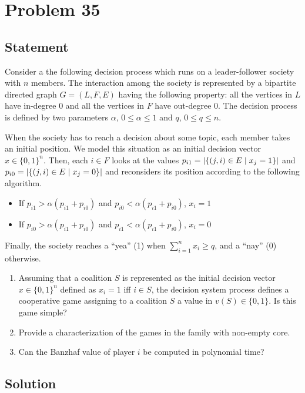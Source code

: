 \documentclass[a4paper, 11pt]{article}
\newcommand{\onemm}[0]{\hspace{1mm}}
\newcommand{\suchthat}[0]{\onemm|\onemm}
\begin{document}
\section*{Problem 35}
{\color{statement}
\subsection*{Statement}
Consider a the following decision process which runs on a leader-follower society with $n$ members. The interaction among the society is represented by a bipartite directed graph $G = (L,F,E)$ having the following property: all the vertices in $L$ have in-degree 0 and all the vertices in $F$ have out-degree 0. The decision process is defined by two parameters $\alpha$, $0 \leq \alpha \leq 1$ and $q$, $0 \leq q \leq n$.

When the society has to reach a decision about some topic, each member takes an initial position. We model this situation as an initial decision vector $x \in \{0, 1\}^n$. Then, each $i \in F$ looks at the values $p_{i1} =|\{(j,i) \in E \suchthat x_j = 1\}|$ and $p_{i0} = |\{(j,i) \in E \suchthat x_j = 0\}|$ and reconsiders its position according to the following algorithm.

\begin{itemize}
    \item If $p_{i1} > \alpha(p_{i1}+p_{i0})$ and $p_{i0} < \alpha(p_{i1}+p_{i0})$, $x_i =1$
    \item If $p_{i0} > \alpha(p_{i1}+p_{i0})$ and $p_{i1} < \alpha(p_{i1}+p_{i0})$, $x_i =0$
\end{itemize}

Finally, the society reaches a ``yea'' (1) when $\sum^n_{i=1} x_i \geq q$, and a ``nay'' (0) otherwise.
\begin{enumerate}[label=(\alph*)]
    \item Assuming that a coalition $S$ is represented as the initial decision vector $x \in \{0,1\}^n$ defined as $x_i = 1$ iff $i \in S$, the decision system process defines a cooperative game assigning to a coalition $S$ a value in $v(S) \in \{0, 1\}$. Is this game simple?
    \item Provide a characterization of the games in the family with non-empty core.
    \item Can the Banzhaf value of player $i$ be computed in polynomial time?
\end{enumerate}
}
\subsection*{Solution}
\end{document}
